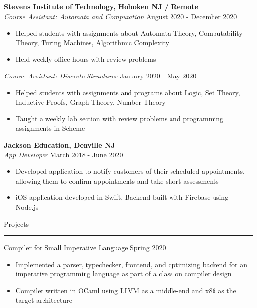 \documentclass{article}
\newcommand \spacingBetweenHeadings {0.5em}
\begin{document}
\noindent
\textbf{Stevens Institute of Technology, Hoboken NJ / Remote}\\
\textit{Course Assistant: Automata and Computation}
\hfill
August 2020 - December 2020\\
\vspace{-1em}
\begin{itemize}
\item Helped students with assignments about Automata Theory, Computability Theory, Turing Machines, Algorithmic Complexity
\item Held weekly office hours with review problems
\end{itemize}

\noindent
\textit{Course Assistant: Discrete Structures}
\hfill
January 2020 - May 2020\\
\vspace{-1em}
\begin{itemize}
\item Helped students with assignments and programs about Logic, Set Theory, Inductive Proofs, Graph Theory, Number Theory
\item Taught a weekly lab section with review problems and programming assignments in Scheme
\end{itemize}

\noindent
\textbf{Jackson Education, Denville NJ}\\
\textit{App Developer}
\hfill
March 2018 - June 2020\\
\vspace{-1em}
\begin{itemize}
\item Developed application to notify customers of their scheduled appointments, allowing them to \mbox{confirm} appointments and take short assessments
\item iOS application developed in Swift, Backend built with Firebase using Node.js
\end{itemize}


\vspace{\spacingBetweenHeadings}

\noindent
\huge Projects\par
\vspace{0.1em}
\hrule
\Large
\vspace{1em}
\noindent
Compiler for Small Imperative Language
\hfill
Spring 2020\\
\vspace{-1em}
\begin{itemize}
\item Implemented a parser, typechecker, frontend, and optimizing backend for an imperative programming language as part of a class on compiler design
\item Compiler written in OCaml using LLVM as a middle-end and x86 as the target architecture
\end{itemize}
\end{document}
